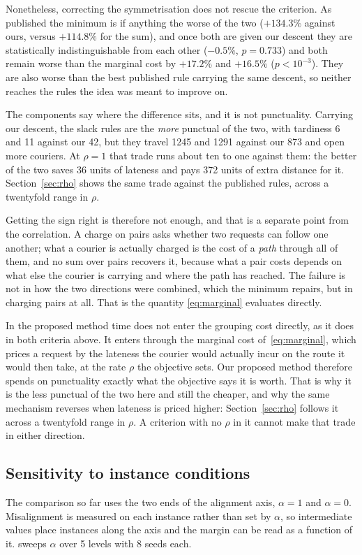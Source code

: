 Nonetheless, correcting the symmetrisation does not rescue the criterion. As published the
minimum is if anything the worse of the two
($+134.3\%$ against ours, versus
$+114.8\%$ for the sum), and once
both are given our descent they are statistically indistinguishable from each
other ($-0.5\%$, $p=0.733$) and both remain worse than
the marginal cost by $+17.2\%$ and $+16.5\%$
($p<10^{-3}$). They are also worse than the best published rule carrying
the same descent, so neither reaches the rules the idea was meant to improve on.

The components say where the difference sits, and it is not punctuality. Carrying
our descent, the slack rules are the \emph{more} punctual of the two, with
tardiness 6 and 11 against our 42, but they travel
1245 and 1291 against our 873 and open more couriers. At
$\rho=1$ that trade runs about ten to one against them: the better of the two
saves 36 units of lateness and pays 372 units of
extra distance for it. Section~\ref{sec:rho} shows the same trade against the
published rules, across a twentyfold range in $\rho$.

Getting the sign right is therefore not enough, and that is a separate point from
the correlation. A charge on pairs
asks whether two requests can follow one another; what a courier is actually
charged is the cost of a \emph{path} through all of them, and no sum over pairs
recovers it, because what a pair costs depends on what else the courier is
carrying and where the path has reached. The failure is not in how the two
directions were combined, which the minimum repairs, but in charging pairs at
all. That is the quantity \eqref{eq:marginal} evaluates directly.

In the proposed method time does not enter the grouping cost directly, as it does
in both criteria above. It enters through the marginal cost
of~\eqref{eq:marginal}, which prices a request by the lateness the courier would
actually incur on the route it would then take, at the rate $\rho$ the objective
sets. Our proposed method therefore spends on punctuality exactly what the
objective says it is worth. That is why it is the
less punctual of the two here and still the cheaper, and why the same mechanism
reverses when lateness is priced higher: Section~\ref{sec:rho} follows it across
a twentyfold range in $\rho$. A criterion with no $\rho$ in it cannot make that
trade in either direction.

\subsection{Sensitivity to instance conditions}\label{sec:sensitivity}
\label{sec:alignaxis}
The comparison so far uses the two ends of the alignment axis, $\alpha=1$ and
$\alpha=0$. Misalignment is measured on each instance rather than set by
$\alpha$, so intermediate values place instances along the axis and the margin
can be read as a function of it.  sweeps
$\alpha$ over 5 levels with 8
seeds each.



